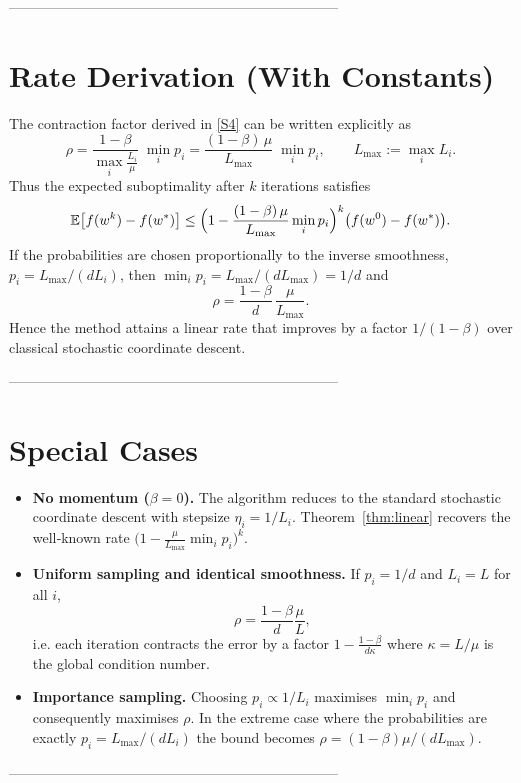 \documentclass{article}
\newcommand{\E}{\mathbb{E}}
\begin{document}
-----------------------------------------------------------------------

\section*{Rate Derivation (With Constants)}
The contraction factor derived in \eqref{S4} can be written explicitly as
\[
\rho
=
\frac{1-\beta}{\displaystyle\max_{i}\frac{L_{i}}{\mu}}
\;\min_{i}p_{i}
=
\frac{(1-\beta)\,\mu}{L_{\max}}\;\min_{i}p_{i},
\qquad
L_{\max}:=\max_{i}L_{i}.
\]
Thus the expected suboptimality after \(k\) iterations satisfies
\[
\E\!\left[f(w^{k})-f(w^{*})\right]
\le
\Bigl(1-\frac{(1-\beta)\,\mu}{L_{\max}}\min_{i}p_{i}\Bigr)^{k}
\bigl(f(w^{0})-f(w^{*})\bigr).
\]
If the probabilities are chosen proportionally to the inverse smoothness,
\(p_{i}=L_{\max}/(dL_{i})\), then
\(\min_{i}p_{i}=L_{\max}/(dL_{\max})=1/d\) and
\[
\rho=\frac{1-\beta}{d}\,\frac{\mu}{L_{\max}}.
\]
Hence the method attains a linear rate that improves by a factor
\(1/(1-\beta)\) over classical stochastic coordinate descent.

-----------------------------------------------------------------------

\section*{Special Cases}
\begin{itemize}
\item \textbf{No momentum (\(\beta=0\)).}  The algorithm reduces to the
standard stochastic coordinate descent with stepsize
\(\eta_{i}=1/L_{i}\).  Theorem~\ref{thm:linear} recovers the well‑known
rate \(\bigl(1-\frac{\mu}{L_{\max}}\min_{i}p_{i}\bigr)^{k}\).

\item \textbf{Uniform sampling and identical smoothness.}
  If \(p_{i}=1/d\) and \(L_{i}=L\) for all \(i\),
  \[
  \rho=\frac{1-\beta}{d}\frac{\mu}{L},
  \]
  i.e. each iteration contracts the error by a factor
  \(1-\frac{1-\beta}{d\kappa}\) where \(\kappa=L/\mu\) is the global
  condition number.

\item \textbf{Importance sampling.}
  Choosing \(p_{i}\propto 1/L_{i}\) maximises \(\min_{i}p_{i}\) and
  consequently maximises \(\rho\).  In the extreme case where the
  probabilities are exactly \(p_{i}=L_{\max}/(dL_{i})\) the bound becomes
  \(\rho=(1-\beta)\mu/(dL_{\max})\).

\end{itemize}

-----------------------------------------------------------------------
\end{document}
